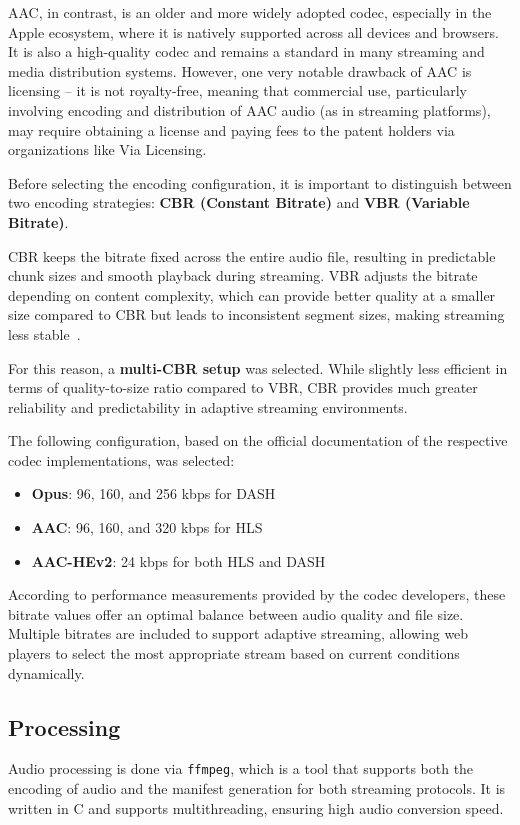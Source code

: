 AAC, in contrast, is an older and more widely adopted codec,
especially in the Apple ecosystem, where it is natively supported across all devices and
browsers. It is also a high-quality codec\cite{opusefficiency}
and remains a standard in many streaming and media distribution systems.
However, one very notable drawback of AAC is licensing – it is not royalty-free, meaning that commercial use,
particularly involving encoding and distribution of AAC audio (as in streaming platforms),
may require obtaining a license and paying fees to the patent holders via organizations like Via Licensing.\cite{vialicensing}


Before selecting the encoding configuration, it is important to distinguish
between two encoding strategies: \textbf{CBR (Constant Bitrate)}\cite{cbr} and \textbf{VBR (Variable Bitrate)}\cite{vbr}.

CBR keeps the bitrate fixed across the entire audio file, resulting in predictable chunk
sizes and smooth playback during streaming. VBR adjusts the bitrate depending on content complexity,
which can provide better quality at a smaller size compared to CBR but leads to inconsistent segment sizes,
making streaming less stable~\cite{cbrvbrcomp}.

For this reason, a \textbf{multi-CBR setup} was selected.
While slightly less efficient in terms of quality-to-size ratio compared to VBR,
CBR provides much greater reliability and predictability in adaptive streaming environments.

The following configuration, based on the official documentation of the respective codec implementations, was selected:
\begin{itemize}[leftmargin=1.5cm]
    \item \textbf{Opus}: 96, 160, and 256 kbps for DASH
    \item \textbf{AAC}: 96, 160, and 320 kbps for HLS
    \item \textbf{AAC-HEv2}: 24 kbps for both HLS and DASH
\end{itemize}
According to performance measurements provided by the codec developers,
these bitrate values offer an optimal balance between audio quality and file size.
Multiple bitrates are included to support adaptive streaming,
allowing web players to select the most appropriate stream based on current conditions dynamically.

\subsection{Processing}
Audio processing is done via \texttt{ffmpeg}\cite{ffmpeg}, which is a tool that supports both the encoding of audio and the
manifest generation for both streaming protocols. It is written in C and supports multithreading, ensuring high audio conversion speed.

